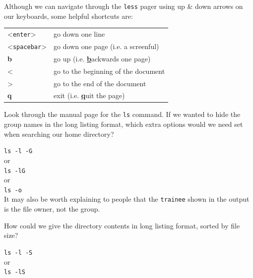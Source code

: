 \documentclass[a4paper,12pt,twoside]{memoir}
\begin{document}
\begin{information}
Although we can navigate through the \texttt{less} pager using up \& down arrows on our keyboards, some helpful shortcuts are:\\

\begin{center}
   \begin{tabular}{p{4cm} p{8cm}}
     \hline
     \textless\texttt{enter}\textgreater & go down one line \\
     \textless\texttt{spacebar}\textgreater & go down one page (i.e. a screenful) \\
     \textbf{b} & go up (i.e. \textbf{\underline{b}}ackwards one page) \\
     \textless & go to the beginning of the document \\
     \textgreater & go to the end of the document \\
     \textbf{q} & exit (i.e. \textbf{\underline{q}}uit the page) \\
     \hline
   \end{tabular}
\end{center}
\end{information}

\begin{questions}
Look through the manual page for the \texttt{ls} command.
If we wanted to hide the group names in the long listing format, which extra options would we need set when searching our home directory? \\

\begin{answer}
\texttt{ls -l -G ~} \\ 
or \\ 
\texttt{ls -lG ~} \\ 
or \\
\texttt{ls -o ~} \\
It may also be worth explaining to people that the \texttt{trainee} shown in the output is the file owner, not the group. \\
\end{answer}


How could we give the directory contents in long listing format, sorted by file size? \\
\begin{answer}
\texttt{ls -l -S ~} \\
or \\
\texttt{ls -lS ~} \\
\end{answer}
\end{questions}
\end{document}
